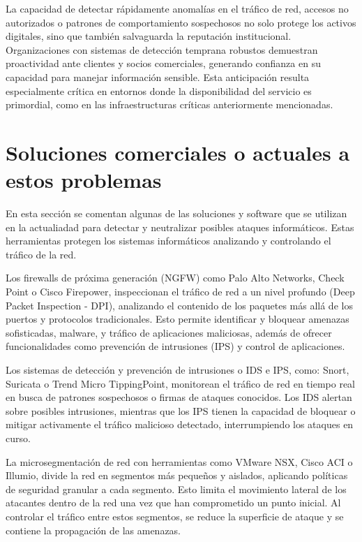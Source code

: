 La capacidad de detectar rápidamente anomalías en el tráfico de red, accesos no autorizados o patrones de comportamiento sospechosos no solo protege los activos digitales, sino que también salvaguarda la reputación institucional. Organizaciones con sistemas de detección temprana robustos demuestran proactividad ante clientes y socios comerciales, generando confianza en su capacidad para manejar información sensible. Esta anticipación resulta especialmente crítica en entornos donde la disponibilidad del servicio es primordial, como en las infraestructuras críticas anteriormente mencionadas.

\section{Soluciones comerciales o actuales a estos problemas}

En esta sección se comentan algunas de las soluciones y software que se utilizan en la actualiadad para detectar y neutralizar posibles ataques informáticos. Estas herramientas protegen los sistemas informáticos analizando y controlando el tráfico de la red.

Los firewalls de próxima generación (NGFW) como Palo Alto Networks, Check Point o Cisco Firepower, inspeccionan el tráfico de red a un nivel profundo (Deep Packet Inspection - DPI), analizando el contenido de los paquetes más allá de los puertos y protocolos tradicionales. Esto permite identificar y bloquear amenazas sofisticadas, malware, y tráfico de aplicaciones maliciosas, además de ofrecer funcionalidades como prevención de intrusiones (IPS) y control de aplicaciones. \cite{cosmikal_firewall}

Los sistemas de detección y prevención de intrusiones o IDS e IPS, como: Snort, Suricata o Trend Micro TippingPoint, monitorean el tráfico de red en tiempo real en busca de patrones sospechosos o firmas de ataques conocidos. Los IDS alertan sobre posibles intrusiones, mientras que los IPS tienen la capacidad de bloquear o mitigar activamente el tráfico malicioso detectado, interrumpiendo los ataques en curso. \cite{geekflare_ids_ips}

La microsegmentación de red con herramientas como VMware NSX, Cisco ACI o Illumio, divide la red en segmentos más pequeños y aislados, aplicando políticas de seguridad granular a cada segmento. Esto limita el movimiento lateral de los atacantes dentro de la red una vez que han comprometido un punto inicial. Al controlar el tráfico entre estos segmentos, se reduce la superficie de ataque y se contiene la propagación de las amenazas. \cite{paloaltonetworks_microsegmentation}

